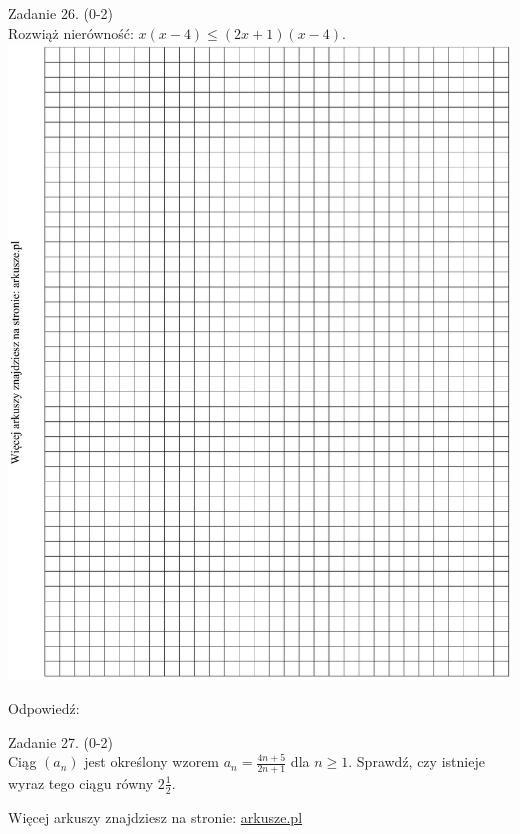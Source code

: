 \documentclass[10pt]{article}
\begin{document}
Zadanie 26. (0-2)\\
Rozwiąż nierówność: \(x(x-4) \leqslant(2 x+1)(x-4)\).\\
\includegraphics[max width=\textwidth, center]{2024_11_21_1e89351873aa60c4c1b9g-10}

Odpowiedź:

Zadanie 27. (0-2)\\
Ciąg \(\left(a_{n}\right)\) jest określony wzorem \(a_{n}=\frac{4 n+5}{2 n+1}\) dla \(n \geqslant 1\). Sprawdź, czy istnieje wyraz tego ciągu równy \(2 \frac{1}{2}\).

Więcej arkuszy znajdziesz na stronie: \href{http://arkusze.pl}{arkusze.pl}
\end{document}
